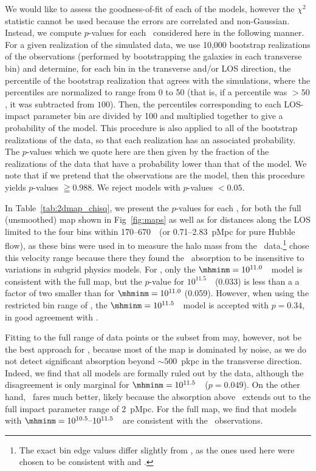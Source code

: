 \documentclass[useAMS,usenatbib,letterpaper]{mn2e}
\def\obspaper{\citetalias{turner14}}
\begin{document}
We would like to assess the goodness-of-fit of each of the models, 
however the $\chi^2$ statistic cannot be used because the errors are correlated and non-Gaussian.
Instead, we compute $p$-values for each \mhmin\ considered
here in the following manner. For a given realization of the simulated data,
we use 10,000 bootstrap realizations of the observations (performed by bootstrapping
the galaxies in each transverse bin)
and determine, for each bin in the transverse and/or LOS direction, the percentile of the bootstrap
realization that agrees with the simulations,
where the percentiles are normalized to range from 0 to 50
(that is, if a percentile was $>50$, it was subtracted from $100$). 
Then, the percentiles corresponding to each LOS-impact parameter bin 
are divided by 100 and multiplied together to give a probability of the model.
This procedure is also applied to all of the bootstrap realizations of the data,
so that each realization has an associated probability. The $p$-values which we quote here
are then given by the fraction of the realizations of the data that have a probability lower
than that of the model. We note that if we pretend that the observations 
are the model, then this procedure yields $p$-values 
$\geqq0.988$. We reject models with $p$-values $<0.05$. 

In Table~\ref{tab:2dmap_chisq}, we present the $p$-values for each \mhmin,
for both the full (unsmoothed) map shown in Fig~\ref{fig:maps} as well as for distances along the LOS limited to the four bins within
170--670~\kmps\ (or 0.71--2.83~pMpc for pure Hubble flow), as these bins were used in \citet{rakic13} to measure
the halo mass from the \hone\ data.\footnote{The exact bin edge values differ slightly from \citet{rakic13},
as the ones used here were chosen to be consistent with \citet{rakic12} and \obspaper.} \citet{rakic13} chose this velocity range
because there they found the \hone\ absorption to be insensitive to variations in subgrid physics models.  
For \hone, only the $\mhminm=10^{11.0}$~\msol\ model is consistent with the full map,
but the $p$-value for $10^{11.5}$~\msol\  (0.033) is less than a a factor of two smaller than for
$\mhminm=10^{11.0}$ (0.059). However, when using the restricted bin range of \citet{rakic13}, 
the $\mhminm=10^{11.5}$~\msol\ model
is accepted with $p=0.34$, in good agreement with \citet{rakic13}. 

Fitting to the full range of data
points or the subset from \citet{rakic13} may, however, not be the best approach for \sifour, 
because most of the map is dominated by noise, as we do not detect significant 
absorption beyond $\sim500$~pkpc in the transverse
direction. Indeed, we find that 
all models are formally ruled out by the data, although the disagreement is only
marginal for $\mhminm=10^{11.5}$~\msol\ ($p=0.049$). 
On the other hand, \cfour\ fares much better, likely because the absorption above \taurndcfour\ extends
out to the full impact parameter range of 2~pMpc. For the full map, we find that models with
 $\mhminm=10^{10.5}\text{--}10^{11.5}$~\msol\ are consistent with the \cfour\ observations.
\end{document}
